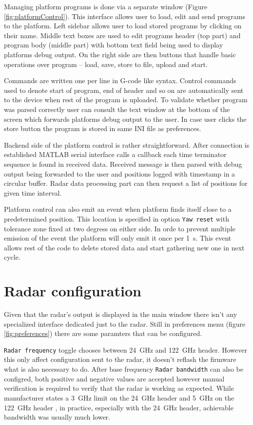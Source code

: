 Managing platform programs is done via a separate window (Figure \ref{fig:platformControl}).
This interface allows user to load, edit and send programs to the platform.
Left sidebar allows user to load stored programs by clicking on their name.
Middle text boxes are used to edit programs header (top part) and program body (middle part) with bottom text field being used to display platforms debug output.
On the right side are then buttons that handle basic operations over program -- load, save, store to file, upload and start.

Commands are written one per line in G-code like syntax.
Control commands used to denote start of program, end of header and so on are automatically sent to the device when rest of the program is uploaded.
To validate whether program was parsed correctly user can consult the text window at the bottom of the screen which forwards platforms debug output to the user.
In case user clicks the store button the program is stored in same INI file as preferences.


Backend side of the platform control is rather straightforward.
After connection is established MATLAB serial interface calls a callback each time terminator sequence is found in received data.
Received message is then parsed with debug output being forwarded to the user and positions logged with timestamp in a circular buffer.
Radar data processing part can then request a list of positions for given time interval.

Platform control can also emit an event when platform finds itself close to a predetermined position.
This location is specified in option \texttt{Yaw reset} with tolerance zone fixed at two degress on either side.
In orde to prevent multiple emission of the event the platform will only emit it once per 1~s.
This event allows rest of the code to delete stored data and start gathering new one in next cycle.

\section{Radar configuration}

Given that the radar's output is displayed in the main window there isn't any specialized interface dedicated just to the radar.
Still in preferences menu (figure \ref{fig:preferences}) there are some paramters that can be configured.

\texttt{Radar frequency} toggle chooses between 24~GHz and 122~GHz header.
However this only affect configuration sent to the radar, it doesn't reflash the firmware what is also necessary to do.
After base frequency \texttt{Radar bandwidth} can also be configred, both positive and negative values are accepted however manual verification is required to verify that the radar is working as expected.
While manufacturer states a 3~GHz limit on the 24~GHz header and 5~GHz on the 122~GHz header \cite{sidarPRO}, in practice, especially with the 24~GHz header, achievable bandwidth was usually much lower.

